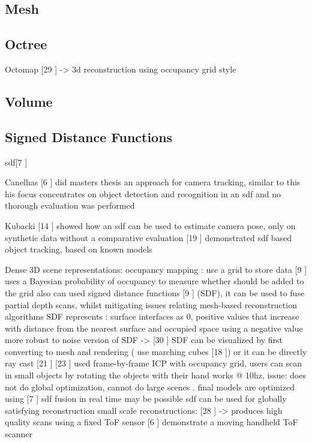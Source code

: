 
\subsection{Mesh}
\subsection{Octree}

\cite{Wurm10Octomap}
Octomap [29 \cite{Wurm10Octomap}] -> 3d reconstruction using occupancy grid style 

\subsection{Volume}

\subsection{Signed Distance Functions}

sdf[7 \cite{Curless96Volumetric}]

Canelhas [6 \cite{Canelhas12Scene}] did masters thesis an approach for camera tracking, similar to this
his focus concentrates on object detection and recognition in an sdf and no thorough evaluation was performed

Kubacki [14 \cite{Kubacki12Registration}] showed how an sdf can be used to estimate camera pose, only on synthetic data without a comparative evaluation
[19 \cite{Ren12Unified}] demonstrated sdf based object tracking, based on known models

Dense 3D scene representations:
occupancy mapping : use a grid to store data
[9 \cite{Elfes87Sensor}] uses a Bayesian probability of occupancy to measure whether should be added to the grid
also can used signed distance functions [9 \cite{Elfes87Sensor}] (SDF), it can be used to fuse partial depth scans, whilst mitigating
issues relating mesh-based reconstruction algorithms
SDF represents : surface interfaces as 0, positive values that increase with distance from the nearest surface
and occupied space using a negative value
more robust to noise version of SDF -> [30 \cite{Zach07Globally} ]
SDF can be visualized by first converting to mesh and rendering ( use marching cubes [18 \cite{Cubes87High}]) or it can be directly ray cast [21 \cite{Parker98Interactive}]
[23 \cite{Rusinkiewicz02Real}] used frame-by-frame ICP with occupancy grid, users can scan in small objects by rotating the objects with their hand
works @ 10hz, issue: does not do global optimization, cannot do large scenes . final models are optimized using [7 \cite{Curless96Volumetric}]
sdf fusion in real time may be possible
sdf can be used for globally satisfying reconstruction
small scale reconstructions:
	[28 \cite{Weise09Hand}] -> produces high quality scans using a fixed ToF sensor
	[6 \cite{Cui103d} ] demonstrate a moving handheld ToF scanner

